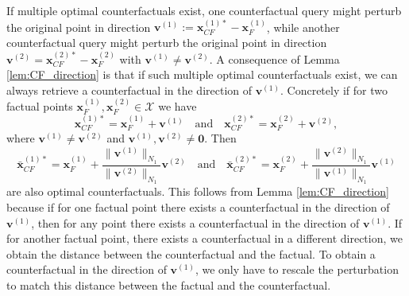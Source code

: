 \documentclass{article}
\begin{document}
If multiple optimal counterfactuals exist, one counterfactual query might perturb the original point in direction $\bm{v}^{(1)}:=\bm{x}^{(1)*}_{CF}-\bm{x}_F^{(1)}$, while another counterfactual query might perturb the original point in direction $\bm{v}^{(2)}=\bm{x}^{(2)*}_{CF}-\bm{x}_F^{(2)}$ with $\bm{v}^{(1)} \neq \bm{v}^{(2)}$. A consequence of Lemma \ref{lem:CF_direction} is that if such multiple optimal counterfactuals exist, we can always retrieve a counterfactual in the direction of $\bm{v}^{(1)}$. Concretely if for two factual points $\bm{x}_F^{(1)}, \bm{x}_F^{(2)} \in \mathcal X$ we have
\[
\bm{x}_{CF}^{(1)*}
  = \bm{x}_F^{(1)} +  \bm{v}^{(1)}
  \quad\text{and}\quad
\bm{x}_{CF}^{(2)*}
  = \bm{x}_F^{(2)} +  \bm{v}^{(2)},
\]
where $\bm{v}^{(1)} \neq \bm{v}^{(2)}$ and $\bm{v}^{(1)}, \bm{v}^{(2)} \neq \bm{0}$. Then
\[
\bar{\bm{x}}_{CF}^{(1)*}
  = \bm{x}_F^{(1)} + \frac{\|\bm{v}^{(1)}\|_{N_1}}{\|\bm{v}^{(2)}\|_{N_1}} \bm{v}^{(2)}
  \quad\text{and}\quad
\bar{\bm{x}}_{CF}^{(2)*}
  = \bm{x}_F^{(2)} +  \frac{\|\bm{v}^{(2)}\|_{N_1}}{\|\bm{v}^{(1)}\|_{N_1}} \bm{v}^{(1)}
\]
are also optimal counterfactuals. This follows from Lemma \ref{lem:CF_direction} because if for one factual point there exists a counterfactual in the direction of $\bm{v}^{(1)}$, then for any point there exists a counterfactual in the direction of $\bm{v}^{(1)}$. If for another factual point, there exists a counterfactual in a different direction, we obtain the distance between the counterfactual and the factual. To obtain a counterfactual in the direction of $\bm{v}^{(1)}$, we only have to rescale the perturbation to match this distance between the factual and the counterfactual.
\end{document}
